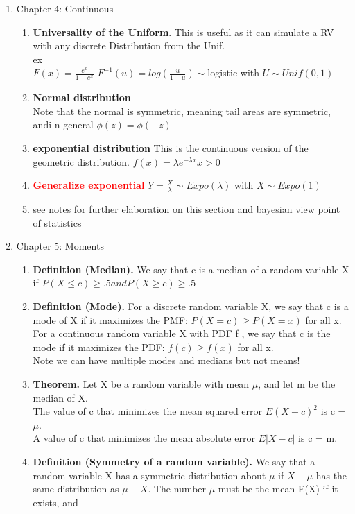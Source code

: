 \documentclass[11pt]{article}
\begin{document}
\begin{enumerate}
\begin{enumerate}
\end{enumerate}
\item Chapter 4: Continuous
\begin{enumerate}
	\item \textbf{Universality of the Uniform}. This is useful as it can simulate a RV with any discrete Distribution from the Unif.
	\\
	ex\\
	$F(x) = \frac{e^x}{1+e^x} \, \, F^{-1}(u) = log(\frac{u}{1-u}) \sim $logistic with $U \sim Unif(0,1)$ 
	\item \textbf{Normal distribution}\\
	Note that the normal is symmetric, meaning tail areas are symmetric, andi n general $\phi(z)=\phi(-z)$
	\item \textbf{exponential distribution} This is the continuous version of the geometric distribution. $f(x) = \lambda e^{-\lambda x} x>0$
	\item \textcolor{red}{\textbf{Generalize exponential  }}$Y = \frac{X}{\lambda} \sim Expo(\lambda)$ with $X \sim Expo(1)$
	\item see notes for further elaboration on this section and bayesian view point of statistics
\end{enumerate}
\item Chapter 5: Moments
\begin{enumerate}
	\item \textbf{ Definition (Median).} We say that c is a median of a random variable X if $P(X \le c) \ge .5 and P(X \ge c) \ge .5$
	\item \textbf{Definition (Mode).} For a discrete random variable X, we say that c is a mode of X if it maximizes the PMF:
	$P(X = c) \ge P(X = x)$ for all x. For a continuous random variable X with PDF f , we say that c is the mode
	if it maximizes the PDF: $f(c) \ge f (x)$ for all x.\\
	Note we can have multiple modes and medians but not means!
	\item \textbf{Theorem. }Let X be a random variable with mean $\mu$, and let m be the median of X.
	\\The value of c that minimizes the mean squared error $E(X - c)^2$ is c = $\mu$.
	\\A value of c that minimizes the mean absolute error $E|X - c|$ is c = m.
	\item\textbf{ Definition (Symmetry of a random variable). }We say that a random variable X has a symmetric distribution
	about $\mu$ if $X-\mu$ has the same distribution as $\mu - X$. The number $\mu$ must be the mean E(X) if it exists, and

\end{enumerate}
\end{enumerate}
\end{document}
